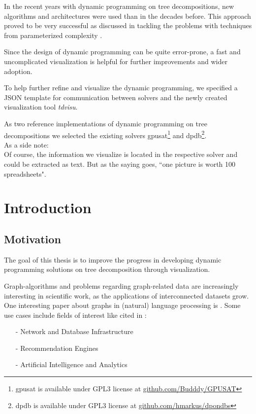 \documentclass[a4paper, 12pt, bibliography=totoc]{scrartcl}
\begin{document}
In the recent years with dynamic programming on tree decompositions, new algorithms and architectures were used than in the decades before. This approach proved to be very successful as discussed in \cite{fichtegpusat2} tackling the problems with techniques from parameterized complexity \cite[p. 2]{dpdbpadl2020}.

Since the design of dynamic programming can be quite error-prone, a fast and uncomplicated visualization is helpful for further improvements and wider adoption.

To help further refine and visualize the dynamic programming,
we specified a JSON template for communication between solvers and the newly created visualization tool \textit{tdvisu}.

As two reference implementations of dynamic programming on tree decompositions we selected the existing solvers {gpusat}\footnote{gpusat is available under GPL3 license at \url{github.com/Budddy/GPUSAT}} and {dpdb}\footnote{dpdb is available under GPL3 license at \url{github.com/hmarkus/dpondbs}}.\\

As a side note: \\
Of course, the information we visualize is located in the respective solver and could be extracted as text. But as the saying goes, ``one picture is worth 100 spreadsheets".


{%
	\newpage
	
\tableofcontents
}

\newpage


\section{Introduction}
\subsection{Motivation}

The goal of this thesis is to improve the progress in developing dynamic programming solutions on tree decomposition through visualization.

Graph-algorithms and problems regarding graph-related data are increasingly interesting in scientific work, as the applications of interconnected datasets grow. One interesting paper about graphs in (natural) language processing is \cite{jones-etal-2013-modeling}.
Some use cases include fields of interest like cited in \cite{graphUseCases}: %
\begin{itemize}
	\item[-] Network and Database Infrastructure
	\item[-] Recommendation Engines
	\item[-] Artificial Intelligence and Analytics
\end{itemize}
\end{document}
